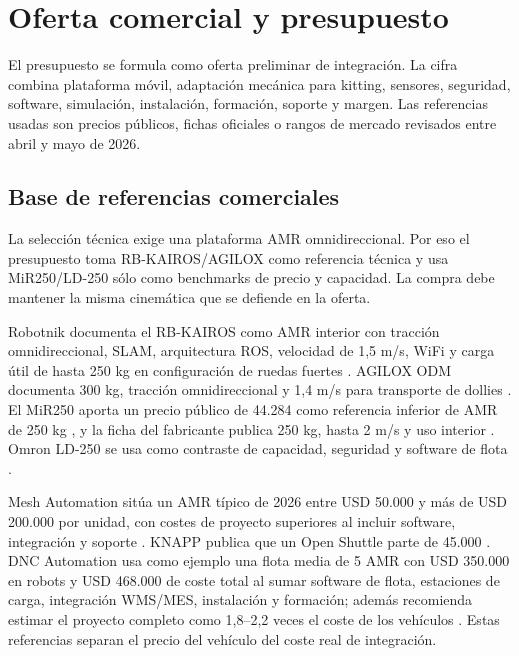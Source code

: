 \chapter{Oferta comercial y presupuesto}

El presupuesto se formula como oferta preliminar de integración. La cifra combina plataforma móvil, adaptación mecánica para kitting, sensores, seguridad, software, simulación, instalación, formación, soporte y margen. Las referencias usadas son precios públicos, fichas oficiales o rangos de mercado revisados entre abril y mayo de 2026.

\section{Base de referencias comerciales}

La selección técnica exige una plataforma AMR omnidireccional. Por eso el presupuesto toma RB-KAIROS/AGILOX como referencia técnica y usa MiR250/LD-250 sólo como benchmarks de precio y capacidad. La compra debe mantener la misma cinemática que se defiende en la oferta.

Robotnik documenta el RB-KAIROS como AMR interior con tracción omnidireccional, SLAM, arquitectura ROS, velocidad de 1,5 m/s, WiFi y carga útil de hasta 250 kg en configuración de ruedas fuertes \cite{robotnikRbKairos,robotnikRbKairosDatasheet}. AGILOX ODM documenta 300 kg, tracción omnidireccional y 1,4 m/s para transporte de dollies \cite{agiloxOdm}. El MiR250 aporta un precio público de 44.284 \texteuro{} como referencia inferior de AMR de 250 kg \cite{mekosrlMir250}, y la ficha del fabricante publica 250 kg, hasta 2 m/s y uso interior \cite{mir250Specs}. Omron LD-250 se usa como contraste de capacidad, seguridad y software de flota \cite{omronLd250}.

Mesh Automation sitúa un AMR típico de 2026 entre USD 50.000 y más de USD 200.000 por unidad, con costes de proyecto superiores al incluir software, integración y soporte \cite{meshAmrCost2026}. KNAPP publica que un Open Shuttle parte de 45.000 \texteuro{} \cite{knappAmrRoi2026}. DNC Automation usa como ejemplo una flota media de 5 AMR con USD 350.000 en robots y USD 468.000 de coste total al sumar software de flota, estaciones de carga, integración WMS/MES, instalación y formación; además recomienda estimar el proyecto completo como 1,8--2,2 veces el coste de los vehículos \cite{dncAmrCost2026}. Estas referencias separan el precio del vehículo del coste real de integración.

